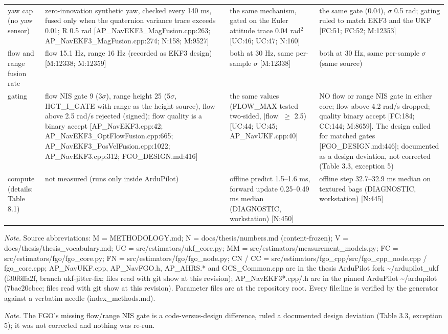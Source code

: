 \begin{table}[htbp]
\begin{tabular}{p{}p{}p{}p{}}
yaw cap (no yaw sensor) & zero-innovation synthetic yaw, checked every 140 ms, fused only when the quaternion variance trace exceeds 0.01; R 0.5 rad [AP\_NavEKF3\_MagFusion.cpp:263; AP\_NavEKF3\_MagFusion.cpp:274; N:158; M:9527] & the same mechanism, gated on the Euler attitude trace 0.04 rad$^2$ [UC:46; UC:47; N:160] & the same gate (0.04), $\sigma$ 0.5 rad; gating ruled to match EKF3 and the UKF [FC:51; FC:52; M:12353] \\
flow and range fusion rate & flow 15.1 Hz, range 16 Hz (recorded as EKF3 design) [M:12338; M:12359] & both at 30 Hz, same per-sample $\sigma$ [M:12338] & both at 30 Hz, same per-sample $\sigma$ (same source) \\
gating & flow NIS gate 9 (3$\sigma$), range height 25 (5$\sigma$, HGT\_I\_GATE with range as the height source), flow above 2.5 rad/s rejected (signed); flow quality is a binary accept [AP\_NavEKF3.cpp:42; AP\_NavEKF3\_OptFlowFusion.cpp:665; AP\_NavEKF3\_PosVelFusion.cpp:1022; AP\_NavEKF3.cpp:312; FGO\_DESIGN.md:416] & the same values (FLOW\_MAX tested two-sided, $|$flow$|$ $\ge$ 2.5) [UC:44; UC:45; AP\_NavUKF.cpp:40] & NO flow or range NIS gate in either core; flow above 4.2 rad/s dropped; quality binary accept [FC:184; CC:144; M:8659]. The design called for matched gates [FGO\_DESIGN.md:446]; documented as a design deviation, not corrected (Table 3.3, exception 5) \\
compute (details: Table 8.1) & not measured (runs only inside ArduPilot) & offline predict 1.5--1.6 ms, forward update 0.25--0.49 ms median (DIAGNOSTIC, workstation) [N:450] & offline step 32.7--32.9 ms median on textured bags (DIAGNOSTIC, workstation) [N:445] \\
\bottomrule
\end{tabular}
\par\smallskip\raggedright
\textit{Note.} Source abbreviations: M = METHODOLOGY.md; N = docs/thesis/numbers.md (content-frozen); V = docs/thesis/thesis\_vocabulary.md; UC = src/estimators/ukf\_core.py; MM = src/estimators/measurement\_models.py; FC = src/estimators/fgo/fgo\_core.py; FN = src/estimators/fgo/fgo\_node.py; CN / CC = src/estimators/fgo\_cpp/src/fgo\_cpp\_node.cpp / fgo\_core.cpp; AP\_NavUKF.cpp, AP\_NavFGO.h, AP\_AHRS.* and GCS\_Common.cpp are in the thesis ArduPilot fork \textasciitilde{}/ardupilot\_ukf (f30f6ffa2f, branch ukf-jitter-fix; files read with git show at this revision); AP\_NavEKF3*.cpp/.h are in the pinned ArduPilot \textasciitilde{}/ardupilot (7bac20cbcc; files read with git show at this revision). Parameter files are at the repository root. Every file:line is verified by the generator against a verbatim needle (index\_methods.md).\par
\textit{Note.} The FGO's missing flow/range NIS gate is a code-versus-design difference, ruled a documented design deviation (Table 3.3, exception 5); it was not corrected and nothing was re-run.\par
\end{table}
